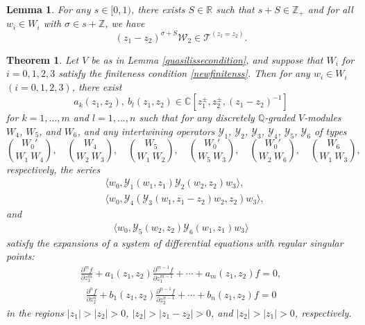 \documentclass[9pt]{amsart}
\newtheorem{theorem}{Theorem}[section]
\newtheorem{lemma}{Lemma}[section]
\newcommand{\T}{\mathcal{T}}
\begin{document}
\begin{lemma}\label{lem9.3}
For any $s \in [0,1)$, there exists $S \in \mathbb{R}$ such that $s + S \in \mathbb{Z}_{+}$ and for all $w_i \in W_i$ with $\sigma \in s + \mathbb{Z}$, we have
\[
(z_1 - z_2)^{\sigma + S} \mathcal{W}_2 \in \T^{(z_1 = z_2)}.
\]
\end{lemma}




\begin{theorem}\label{differentialintertwining}
Let $V$ be as in Lemma \ref{quasilissecondition}, and suppose that $W_i$ for $i=0,1,2,3$ satisfy the finiteness condition \eqref{newfinitenss}. Then for any $w_i \in W_i$ $(i = 0,1,2,3)$, there exist
\[
a_k(z_1, z_2),\ b_l(z_1, z_2) \in \mathbb{C}[z_1^{\pm}, z_2^{\pm}, (z_1 - z_2)^{-1}]
\]
for $k = 1, \dots, m$ and $l = 1, \dots, n$ such that for any discretely $\mathbb{Q}$-graded $V$-modules $W_4$, $W_5$, and $W_6$, and any intertwining operators $\mathcal{Y}_1$, $\mathcal{Y}_2$, $\mathcal{Y}_3$, $\mathcal{Y}_4$, $\mathcal{Y}_5$, $\mathcal{Y}_6$ of types
\[
\binom{W_0'}{W_1\ W_4},\quad \binom{W_4}{W_2\ W_3},\quad \binom{W_5}{W_1\ W_2},\quad \binom{W_0'}{W_5\ W_3},\quad \binom{W_0'}{W_2\ W_6},\quad \binom{W_6}{W_1\ W_3},
\]
respectively, the series
\begin{align}
&\langle w_0, \mathcal{Y}_1(w_1, z_1)\mathcal{Y}_2(w_2, z_2)w_3 \rangle, \label{equn1} \\
&\langle w_0, \mathcal{Y}_4(\mathcal{Y}_3(w_1, z_1 - z_2)w_2, z_2)w_3 \rangle, \label{equn2}
\end{align}
and
\begin{align}
\langle w_0, \mathcal{Y}_5(w_2, z_2)\mathcal{Y}_6(w_1, z_1)w_3 \rangle \label{equn3}
\end{align}
satisfy the expansions of a system of differential equations with regular singular points:
\begin{align}\label{equn4}
\frac{\partial^m f}{\partial z_1^m} + a_1(z_1, z_2)\frac{\partial^{m-1} f}{\partial z_1^{m-1}} + \cdots + a_m(z_1, z_2)f = 0,
\end{align}
\begin{align}\label{equn5}
\frac{\partial^n f}{\partial z_2^n} + b_1(z_1, z_2)\frac{\partial^{n-1} f}{\partial z_2^{n-1}} + \cdots + b_n(z_1, z_2)f = 0
\end{align}
in the regions $|z_1| > |z_2| > 0$, $|z_2| > |z_1 - z_2| > 0$, and $|z_2| > |z_1| > 0$, respectively.
\end{theorem}
\end{document}
